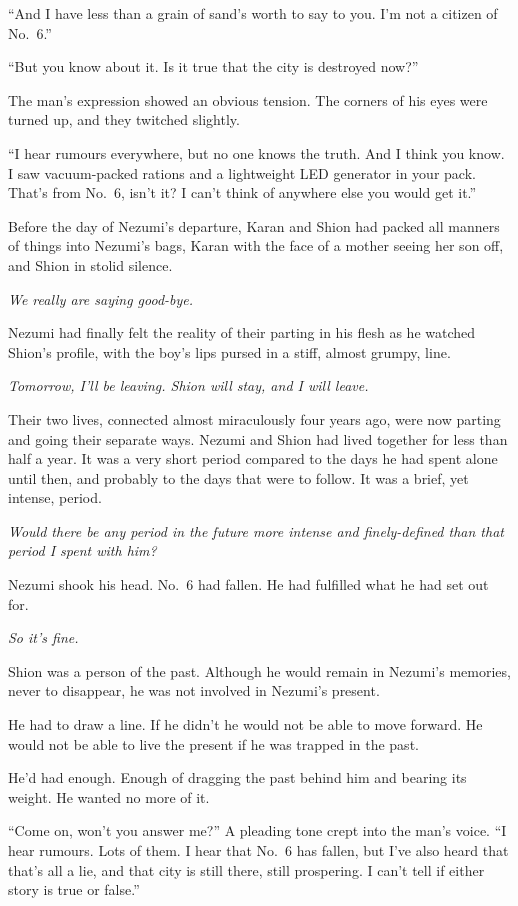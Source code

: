 ``And I have less than a grain of sand's worth to say to you. I'm not a
citizen of No.~6.''

``But you know about it. Is it true that the city is destroyed now?''

The man's expression showed an obvious tension. The corners of his eyes
were turned up, and they twitched slightly.

``I hear rumours everywhere, but no one knows the truth. And I think you
know. I saw vacuum-packed rations and a lightweight LED
generator in your pack. That's from No.~6, isn't it? I can't think of
anywhere else you would get it.''

Before the day of Nezumi's departure, Karan and Shion had packed all
manners of things into Nezumi's bags, Karan with the face of a mother
seeing her son off, and Shion in stolid silence.

\emph{We really are saying good-bye.}

Nezumi had finally felt the reality of their parting in his flesh as he
watched Shion's profile, with the boy's lips pursed in a stiff, almost
grumpy, line.

\emph{Tomorrow, I'll be leaving. Shion will stay, and I will leave.}

Their two lives, connected almost miraculously four years ago, were now
parting and going their separate ways. Nezumi and Shion had lived
together for less than half a year. It was a very short period compared
to the days he had spent alone until then, and probably to the days that
were to follow. It was a brief, yet intense, period.

\emph{Would there be any period in the future more intense and finely-defined
than that period I spent with him?}

Nezumi shook his head. No.~6 had fallen. He had fulfilled what he had
set out for.

\emph{So it's fine.}

Shion was a person of the past. Although he would remain in Nezumi's
memories, never to disappear, he was not involved in Nezumi's present.

He had to draw a line. If he didn't he would not be able to move
forward. He would not be able to live the present if he was trapped in
the past.

He'd had enough. Enough of dragging the past behind him and
bearing its weight. He wanted no more of it.

``Come on, won't you answer me?'' A pleading tone crept into the man's
voice. ``I hear rumours. Lots of them. I hear that No.~6 has fallen, but
I've also heard that that's all a lie, and that city is still there,
still prospering. I can't tell if either story is true or false.''

